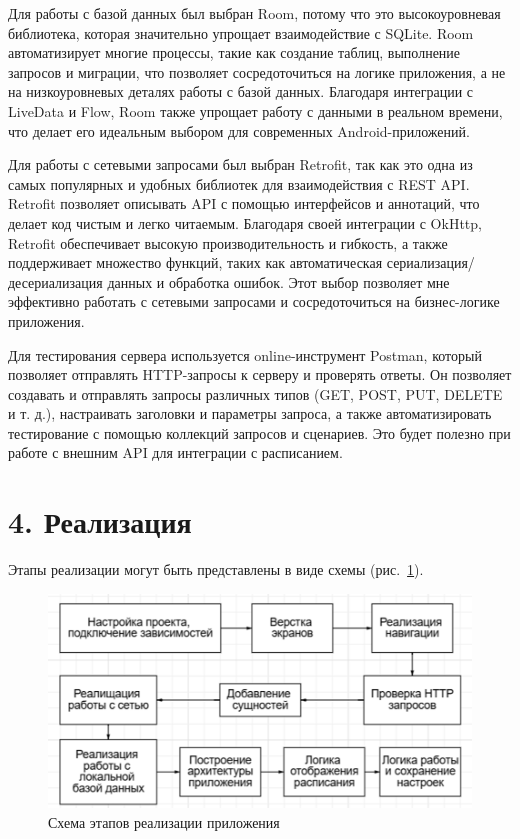 \documentclass{vsureport}
\begin{document}
Для работы с базой данных был выбран Room, потому что это высокоуровневая библиотека, которая значительно упрощает взаимодействие с SQLite. Room автоматизирует многие процессы, такие как создание таблиц, выполнение запросов и миграции, что позволяет сосредоточиться на логике приложения, а не на низкоуровневых деталях работы с базой данных. Благодаря интеграции с LiveData и Flow, Room также упрощает работу с данными в реальном времени, что делает его идеальным выбором для современных Android-приложений. 

Для работы с сетевыми запросами был выбран Retrofit, так как это одна из самых популярных и удобных библиотек для взаимодействия с REST API. Retrofit позволяет описывать API с помощью интерфейсов и аннотаций, что делает код чистым и легко читаемым. Благодаря своей интеграции с OkHttp, Retrofit обеспечивает высокую производительность и гибкость, а также поддерживает множество функций, таких как автоматическая сериализация/десериализация данных и обработка ошибок. Этот выбор позволяет мне эффективно работать с сетевыми запросами и сосредоточиться на бизнес-логике приложения. 

Для тестирования сервера используется online-инструмент Postman, который позволяет отправлять HTTP-запросы к серверу и проверять ответы. Он позволяет создавать и отправлять запросы различных типов (GET, POST, PUT, DELETE и т. д.), настраивать заголовки и параметры запроса, а также автоматизировать тестирование с помощью коллекций запросов и сценариев. Это будет полезно при работе с внешним API для интеграции с расписанием.

\newpage
\section*{4. Реализация}

Этапы реализации могут быть представлены в виде схемы (рис.~\ref{fig:fig1}).

\begin{figure}[htbp]
	\centering
	\includegraphics[width=1.0\textwidth]{1.png}
	\caption{Схема этапов реализации приложения}
	\label{fig:fig1}
\end{figure}
\end{document}

